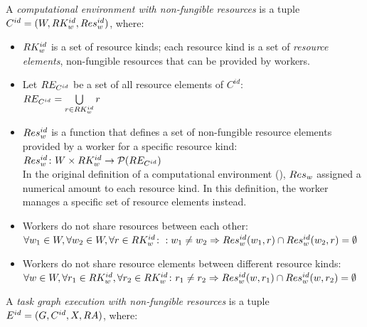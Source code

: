 \vspace{2mm}
 A
\emph{computational environment with non-fungible resources} is a tuple
$C^{id} = (W, RK_w^{id}, Res_w^{id})$, where:
\begin{itemize}[itemsep=0pt]
	\item $RK_w^{id}$ is a set of resource kinds; each resource kind is a set of
	      \emph{resource elements}, non-fungible resources that can be provided by workers.
	\item Let $RE_{C^{id}}$ be a set of all resource elements of $C^{id}$: \\
	      $RE_{C^{id}} = \bigcup\limits_{r\in RK_w^{id}} r$
	\item $Res_w^{id}$ is a function that defines a set of non-fungible resource elements
		  provided by a worker for a specific resource kind: \\ $Res_w^{id}\colon W \times RK_w^{id} \rightarrow \mathcal{P}(RE_{C^{id}})$\vspace{2mm}\\
		  In the original definition of a computational environment (), $Res_w$ assigned a numerical
		  amount to each resource kind. In this  definition, the worker manages a specific set
		  of resource elements instead.
	\item Workers do not share resources between each other: \\
		  $\forall w_1\in{}W, \forall w_2\in{}W, \forall r\in RK_w^{id}\colon:
		  w_1 \neq w_2 \Rightarrow Res_w^{id}(w_1, r) \cap Res_w^{id}(w_2, r) = \emptyset$
	\item Workers do not share resource elements between different resource kinds: \\
		  $\forall w\in{}W, \forall r_1\in RK_w^{id}, \forall r_2\in RK_w^{id}\colon
		  r_1 \neq r_2 \Rightarrow Res_w^{id}(w, r_1) \cap Res_w^{id}(w, r_2) = \emptyset$
\end{itemize}

\vspace{2mm}
 A
\emph{task graph execution with non-fungible resources} is a tuple $E^{id} = (G, C^{id}, X,
	RA)$, where:


